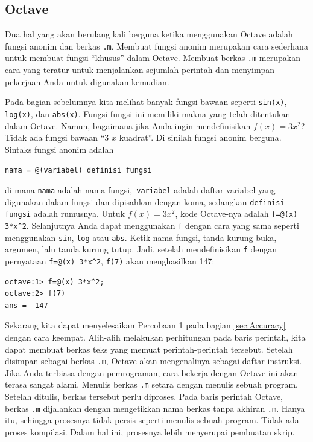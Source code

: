 \subsection{Octave}

Dua hal yang akan berulang kali berguna ketika menggunakan Octave
adalah fungsi anonim  dan berkas \texttt{.m}.
Membuat fungsi anonim merupakan cara sederhana untuk membuat fungsi
``khusus'' dalam Octave. Membuat berkas \texttt{.m} merupakan cara
yang teratur untuk menjalankan sejumlah perintah dan menyimpan pekerjaan
Anda untuk digunakan kemudian. 

Pada bagian sebelumnya kita melihat banyak fungsi bawaan seperti \texttt{sin(x)},
\texttt{log(x)}, dan \texttt{abs(x)}. Fungsi-fungsi ini memiliki makna
yang telah ditentukan dalam Octave. Namun, bagaimana jika Anda ingin
mendefinisikan $f(x)=3x^{2}$? Tidak ada fungsi bawaan ``3 $x$ kuadrat''.
Di sinilah fungsi anonim berguna. Sintaks fungsi anonim adalah

\begin{center}
\texttt{nama = @(variabel) definisi fungsi}
\par\end{center}

\noindent di mana \texttt{nama} adalah nama fungsi,\texttt{ variabel}
adalah daftar variabel yang digunakan dalam fungsi dan dipisahkan
dengan koma, sedangkan \texttt{definisi fungsi} adalah rumusnya. Untuk
$f(x)=3x^{2}$, kode Octave-nya adalah \texttt{f=@(x) 3{*}x\textasciicircum 2}.
Selanjutnya Anda dapat menggunakan \texttt{f} dengan cara yang sama
seperti menggunakan \texttt{sin}, \texttt{log} atau \texttt{abs}.
Ketik nama fungsi, tanda kurung buka, argumen, lalu tanda kurung tutup.
Jadi, setelah mendefinisikan \texttt{f} dengan pernyataan \texttt{f=@(x)
3{*}x\textasciicircum 2}, \texttt{f(7)} akan menghasilkan 147: \begin{verbatim}
octave:1> f=@(x) 3*x^2;
octave:2> f(7)
ans =  147 
\end{verbatim}

Sekarang kita dapat menyelesaikan Percobaan 1 pada bagian \ref{sec:Accuracy}
dengan cara keempat. Alih-alih melakukan perhitungan pada baris perintah,
kita dapat membuat berkas teks yang memuat perintah-perintah tersebut.
Setelah disimpan sebagai berkas \texttt{.m}, Octave akan mengenalinya
sebagai daftar instruksi. Jika Anda terbiasa dengan pemrograman, cara
bekerja dengan Octave ini akan terasa sangat alami. Menulis berkas
\texttt{.m} setara dengan menulis sebuah program. Setelah ditulis,
berkas tersebut perlu diproses. Pada baris perintah Octave, berkas
\texttt{.m} dijalankan dengan mengetikkan nama berkas tanpa akhiran
\texttt{.m}. Hanya itu, sehingga prosesnya tidak persis seperti menulis
sebuah program. Tidak ada proses kompilasi. Dalam hal ini, prosesnya
lebih menyerupai pembuatan skrip. 

